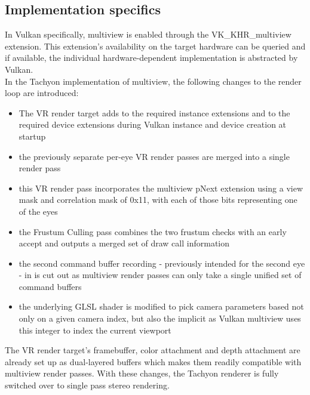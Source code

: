 \subsection{Implementation specifics}
In Vulkan specifically, multiview is enabled through the VK\_KHR\_multiview extension. This extension's availability on the target hardware can be queried and if available, the individual hardware-dependent implementation is abstracted by Vulkan. \\
In the Tachyon implementation of multiview, the following changes to the render loop are introduced: 
\begin{itemize}
\item The VR render target adds  to the required instance extensions and  to the required device extensions during Vulkan instance and device creation at startup
\item the previously separate per-eye VR render passes are merged into a single render pass
\item this VR render pass incorporates the multiview pNext extension using a view mask and correlation mask of 0x11, with each of those bits representing one of the eyes
\item the Frustum Culling pass combines the two frustum checks with an early accept and outputs a merged set of draw call information
\item the second command buffer recording - previously intended for the second eye - in  is cut out as multiview render passes can only take a single unified set of command buffers
\item the underlying GLSL shader is modified to pick camera parameters based not only on a given camera index, but also the implicit  as Vulkan multiview uses this integer to index the current viewport
\end{itemize}
The VR render target's framebuffer, color attachment and depth attachment are already set up as dual-layered buffers which makes them readily compatible with multiview render passes. With these changes, the Tachyon renderer is fully switched over to single pass stereo rendering. 
